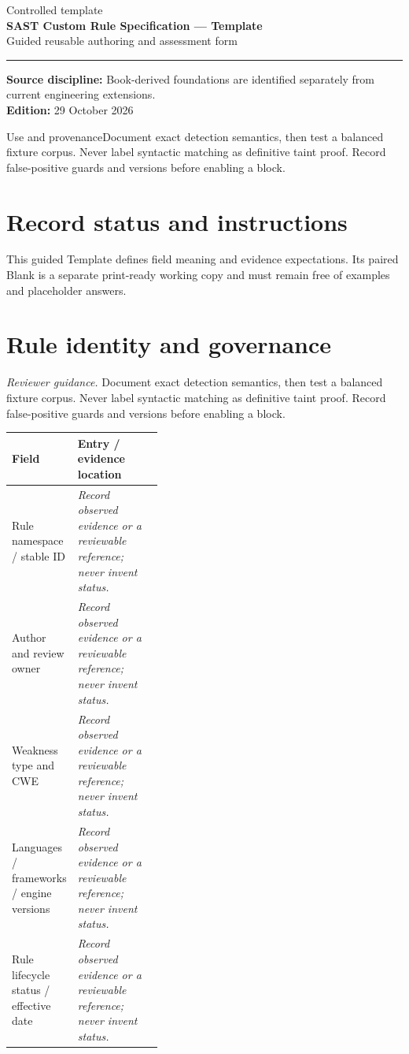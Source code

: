 \documentclass[10pt,letterpaper]{article}
\begin{document}
\hypersetup{pageanchor=false}%
\begin{titlepage}
\vspace*{1.0in}
{\color{bluegray}\Large Controlled template}\\[1.0em]
{\color{navy}\Huge\bfseries SAST Custom Rule Specification --- Template}\\[0.7em]
{\Large Guided reusable authoring and assessment form}\\[2.0em]
\rule{\linewidth}{1.0pt}
\vfill
\textbf{Source discipline:} Book-derived foundations are identified separately from current engineering extensions.\\
\textbf{Edition:} 29 October 2026
\end{titlepage}\hypersetup{pageanchor=true}
\tableofcontents
\clearpage
\begin{focusbox}{Use and provenance}Document exact detection semantics, then test a balanced fixture corpus. Never label syntactic matching as definitive taint proof. Record false-positive guards and versions before enabling a block.\end{focusbox}
\section{Record status and instructions}
This guided Template defines field meaning and evidence expectations. Its paired Blank is a separate print-ready working copy and must remain free of examples and placeholder answers.

\section{Rule identity and governance}
\textit{Reviewer guidance.} Document exact detection semantics, then test a balanced fixture corpus. Never label syntactic matching as definitive taint proof. Record false-positive guards and versions before enabling a block.
\begin{tabularx}{\linewidth}{@{}p{0.38\linewidth}Y@{}}
\toprule Field & Entry / evidence location\\\midrule
Rule namespace / stable ID & \textit{Record observed evidence or a reviewable reference; never invent status.}\\[1.0em]
\midrule
Author and review owner & \textit{Record observed evidence or a reviewable reference; never invent status.}\\[1.0em]
\midrule
Weakness type and CWE & \textit{Record observed evidence or a reviewable reference; never invent status.}\\[1.0em]
\midrule
Languages / frameworks / engine versions & \textit{Record observed evidence or a reviewable reference; never invent status.}\\[1.0em]
\midrule
Rule lifecycle status / effective date & \textit{Record observed evidence or a reviewable reference; never invent status.}\\[1.0em]
\midrule
\end{tabularx}
\end{document}

